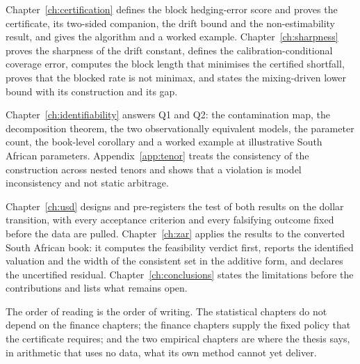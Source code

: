 \documentclass[../../../main.tex]{subfiles}
\begin{document}
Chapter~\ref{ch:certification} defines the block hedging-error score and proves the certificate, its two-sided companion, the drift bound and the non-estimability result, and gives the algorithm and a worked example. Chapter~\ref{ch:sharpness} proves the sharpness of the drift constant, defines the calibration-conditional coverage error, computes the block length that minimises the certified shortfall, proves that the blocked rate is not minimax, and states the mixing-driven lower bound with its construction and its gap.

Chapter~\ref{ch:identifiability} answers Q1 and Q2: the contamination map, the decomposition theorem, the two observationally equivalent models, the parameter count, the book-level corollary and a worked example at illustrative South African parameters. Appendix~\ref{app:tenor} treats the consistency of the construction across nested tenors and shows that a violation is model inconsistency and not static arbitrage.

Chapter~\ref{ch:usd} designs and pre-registers the test of both results on the dollar transition, with every acceptance criterion and every falsifying outcome fixed before the data are pulled. Chapter~\ref{ch:zar} applies the results to the converted South African book: it computes the feasibility verdict first, reports the identified valuation and the width of the consistent set in the additive form, and declares the uncertified residual. Chapter~\ref{ch:conclusions} states the limitations before the contributions and lists what remains open.

The order of reading is the order of writing. The statistical chapters do not depend on the finance chapters; the finance chapters supply the fixed policy that the certificate requires; and the two empirical chapters are where the thesis says, in arithmetic that uses no data, what its own method cannot yet deliver.
\end{document}
